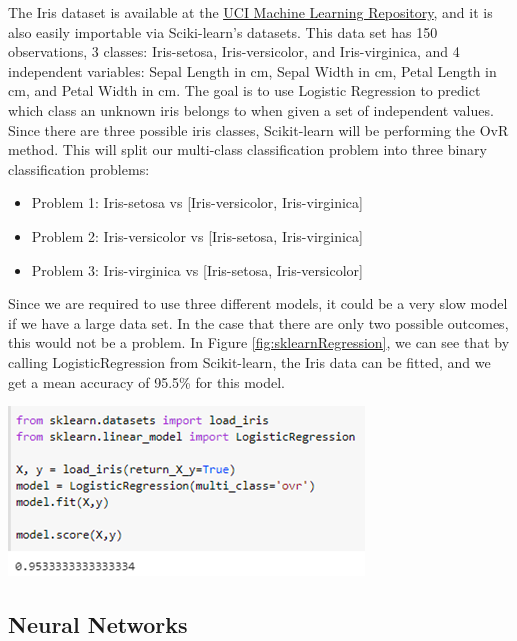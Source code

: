 \documentclass[a4paper,12pt]{report}
\newcommand{\link}[2]{\hyperlink{#1}{\underline{#2}}}
\begin{document}
The Iris dataset is available at the \link{https://archive.ics.uci.edu/ml/datasets/iris}{UCI Machine Learning Repository}, and it is also easily importable via Sciki-learn’s datasets. This data set has 150 observations, 3 classes: Iris-setosa, Iris-versicolor, and Iris-virginica, and 4 independent variables: Sepal Length in cm, Sepal Width in cm, Petal Length in cm, and Petal Width in cm. The goal is to use Logistic Regression to predict which class an unknown iris belongs to when given a set of independent values. Since there are three possible iris classes, Scikit-learn will be performing the OvR method. This will split our multi-class classification problem into three binary classification problems:

\begin{itemize}[,]
    \setlength\itemsep{-.1cm}
    \item Problem 1: Iris-setosa vs [Iris-versicolor, Iris-virginica]
    \item Problem 2: Iris-versicolor vs [Iris-setosa, Iris-virginica]
    \item Problem 3: Iris-virginica vs [Iris-setosa, Iris-versicolor]
\end{itemize}
 
Since we are required to use three different models, it could be a very slow model if we have a large data set. In the case that there are only two possible outcomes, this would not be a problem. In Figure \ref{fig:sklearnRegression}, we can see that by calling LogisticRegression from Scikit-learn, the Iris data can be fitted, and we get a mean accuracy of 95.5\% for this model.

\begin{center}
    \captionsetup{type=figure}
    \includegraphics[width=.5\linewidth]{media/sklearnRegression.png}
    \label{fig:sklearnRegression}
\end{center}

\subsection{Neural Networks}
\end{document}
